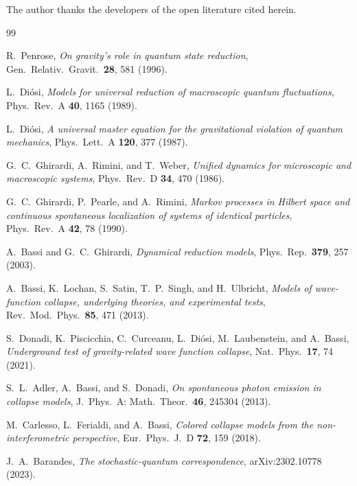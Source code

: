 \documentclass[aps,pra,preprint,amsmath,amssymb,nofootinbib,superscriptaddress]{revtex4-2}
\begin{document}
\begin{acknowledgments}
The author thanks the developers of the open literature cited herein.
\end{acknowledgments}

\begin{thebibliography}{99}

 R.~Penrose,
\textit{On gravity's role in quantum state reduction},
Gen.\ Relativ.\ Gravit.\ \textbf{28}, 581 (1996).

 L.~Di\'osi,
\textit{Models for universal reduction of macroscopic quantum fluctuations},
Phys.\ Rev.\ A \textbf{40}, 1165 (1989).

 L.~Di\'osi,
\textit{A universal master equation for the gravitational violation of quantum
mechanics}, Phys.\ Lett.\ A \textbf{120}, 377 (1987).

 G.~C.~Ghirardi, A.~Rimini, and T.~Weber,
\textit{Unified dynamics for microscopic and macroscopic systems},
Phys.\ Rev.\ D \textbf{34}, 470 (1986).

 G.~C.~Ghirardi, P.~Pearle, and A.~Rimini,
\textit{Markov processes in Hilbert space and continuous spontaneous
localization of systems of identical particles},
Phys.\ Rev.\ A \textbf{42}, 78 (1990).

 A.~Bassi and G.~C.~Ghirardi,
\textit{Dynamical reduction models}, Phys.\ Rep.\ \textbf{379}, 257 (2003).

 A.~Bassi, K.~Lochan, S.~Satin, T.~P.~Singh, and H.~Ulbricht,
\textit{Models of wave-function collapse, underlying theories, and experimental
tests}, Rev.\ Mod.\ Phys.\ \textbf{85}, 471 (2013).

 S.~Donadi, K.~Piscicchia, C.~Curceanu, L.~Di\'osi,
M.~Laubenstein, and A.~Bassi,
\textit{Underground test of gravity-related wave function collapse},
Nat.\ Phys.\ \textbf{17}, 74 (2021).

 S.~L.~Adler, A.~Bassi, and S.~Donadi,
\textit{On spontaneous photon emission in collapse models},
J.\ Phys.\ A: Math.\ Theor.\ \textbf{46}, 245304 (2013).

 M.~Carlesso, L.~Ferialdi, and A.~Bassi,
\textit{Colored collapse models from the non-interferometric perspective},
Eur.\ Phys.\ J.\ D \textbf{72}, 159 (2018).

 J.~A.~Barandes,
\textit{The stochastic-quantum correspondence}, arXiv:2302.10778 (2023).


\end{thebibliography}
\end{document}
